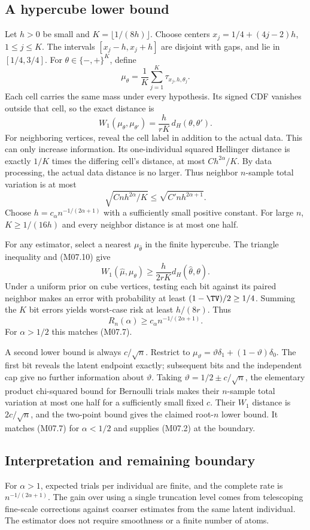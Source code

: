 \documentclass[11pt,a4paper]{article}
\theoremstyle{definition}\newtheorem{definition}[theorem]{Definition}
\theoremstyle{remark}\newtheorem{remark}[theorem]{Remark}
\numberwithin{equation}{section}
\begin{document}
\subsection{A hypercube lower bound}\label{M07-sec-4}
Let $h>0$ be small and $K=\lfloor1/(8h)\rfloor$. Choose centers
$x_j=1/4+(4j-2)h$, $1\le j\le K$. The intervals $[x_j-h,x_j+h]$ are disjoint with gaps, and lie in $[1/4,3/4]$. For $\theta\in\{-,+\}^K$, define
\[
 \mu_\theta=\frac1K\sum_{j=1}^K\tau_{x_j,h,\theta_j}.
\]
Each cell carries the same mass under every hypothesis. Its signed CDF vanishes outside that cell, so the exact distance is
\[
 W_1(\mu_\theta,\mu_{\theta'})=\frac{h}{rK}\,d_H(\theta,\theta').
\tag{M07.10}
\]
For neighboring vertices, reveal the cell label in addition to the actual data. This can only increase information. Its one-individual squared Hellinger distance is exactly $1/K$ times the differing cell's distance, at most $C h^{2\alpha}/K$. By data processing, the actual data distance is no larger. Thus neighbor $n$-sample total variation is at most
\[
 \sqrt{Cnh^{2\alpha}/K}\le\sqrt{C'nh^{2\alpha+1}}.
\]
Choose $h=c_\alpha n^{-1/(2\alpha+1)}$ with a sufficiently small positive constant. For large $n$, $K\ge1/(16h)$ and every neighbor distance is at most one half.

For any estimator, select a nearest $\mu_{\widehat\theta}$ in the finite hypercube. The triangle inequality and (M07.10) give
\[
 W_1(\widehat\mu,\mu_\theta)\ge\frac{h}{2rK}d_H(\widehat\theta,\theta).
\]
Under a uniform prior on cube vertices, testing each bit against its paired neighbor makes an error with probability at least $(1-\TV)/2\ge1/4$. Summing the $K$ bit errors yields worst-case risk at least $h/(8r)$. Thus
\[
 R_n(\alpha)\ge c_\alpha n^{-1/(2\alpha+1)}.\tag{M07.11}
\]
For $\alpha>1/2$ this matches (M07.7).

A second lower bound is always $c/\sqrt n$. Restrict to
$\mu_\vartheta=\vartheta\delta_1+(1-\vartheta)\delta_0$.
The first bit reveals the latent endpoint exactly; subsequent bits and the independent cap give no further information about $\vartheta$. Taking $\vartheta=1/2\pm c/\sqrt n$, the elementary product chi-squared bound for Bernoulli trials makes their $n$-sample total variation at most one half for a sufficiently small fixed $c$. Their $W_1$ distance is $2c/\sqrt n$, and the two-point bound gives the claimed root-$n$ lower bound. It matches (M07.7) for $\alpha<1/2$ and supplies (M07.2) at the boundary.

\subsection{Interpretation and remaining boundary}\label{M07-sec-5}
For $\alpha>1$, expected trials per individual are finite, and the complete rate is $n^{-1/(2\alpha+1)}$. The gain over using a single truncation level comes from telescoping fine-scale corrections against coarser estimates from the same latent individual. The estimator does not require smoothness or a finite number of atoms.
\end{document}
